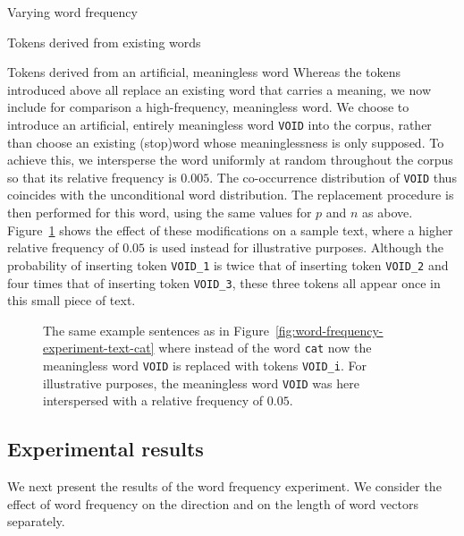 \documentclass{article} %
\newcommand{\word}[1]{\texttt{#1}}
\begin{document}
\begin{section}{Varying word frequency}
\begin{subsection}{Tokens derived from existing words}
\end{subsection}

\begin{subsection}{Tokens derived from an artificial, meaningless word}\label{WFVEmeaningless}
Whereas the tokens introduced above all replace an existing word that
carries a meaning, we now include for comparison a high-frequency,
meaningless word.  We choose to introduce an artificial, entirely
meaningless word \word{VOID} into the corpus, rather than choose an
existing (stop)word whose meaninglessness is only supposed.  To achieve
this, we intersperse the word uniformly at random throughout the corpus so
that its relative frequency is $0.005$.  The co-occurrence
distribution of \word{VOID} thus coincides with the unconditional word
distribution.  The replacement procedure is then performed for this
word, using the same values for $p$ and $n$ as above.
Figure~\ref{fig:word-frequency-experiment-text-void} shows the effect of
these modifications on a sample text, where a higher relative frequency of $0.05$ is used instead
for illustrative purposes.  Although the probability of inserting token
\word{VOID\_1} is twice that of inserting token \word{VOID\_2} and four
times that of inserting token \word{VOID\_3}, these three tokens all
appear once in this small piece of text.

\begin{figure}
	\begin{mdframed}
	
	\end{mdframed}
	\caption{The same example sentences as in
          Figure~\ref{fig:word-frequency-experiment-text-cat} where
          instead of the word \word{cat} now the meaningless word
          \word{VOID} is replaced with tokens \word{VOID\_i}.  For
          illustrative purposes, the meaningless word \word{VOID} was
          here interspersed with a relative frequency of $0.05$.}
	\label{fig:word-frequency-experiment-text-void}
\end{figure}
\end{subsection}

\subsection{Experimental results}\label{WFVE-results}
We next present the results of the word frequency experiment. We
consider the effect of word frequency on the direction and on the length
of word vectors separately.


\end{section}
\end{document}
